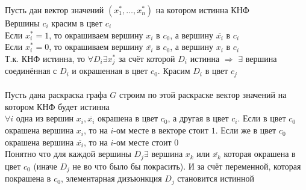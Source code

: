 \documentclass[12pt]{article}
\begin{document}
		Пусть дан вектор значений $(x_1^*, \dotsc, x_n^*)$ на котором истинна КНФ\\
		Вершины $c_i$ красим в цвет $c_i$\\
		Если $x_i^* = 1$, то окрашиваем вершину $x_i$ в $c_0$, а вершину $\overline{x_i}$ в $c_i$\\
		Если $x_i^* = 0$, то окрашиваем вершину $\overline{x_i}$ в $c_0$, а вершину $x_i$ в $c_i$\\
		Т.к. КНФ истинна, то $\forall D_i \exists x_j^*$ за счёт которой $D_i$ истинна $\Rightarrow$ $\exists$ вершина соединённая с $D_i$  и окрашенная в цвет $c_0$. Красим $D_i$ в цвет $c_j$\\\\
		Пусть дана раскраска графа $G$ строим по этой раскраске вектор значений на котором КНФ будет истинна\\
		$\forall i$ одна из вершин $x_i, \overline{x_i}$ окрашена в цвет $c_0$, а другая в цвет $c_i$. Если в цвет $c_0$ окрашена вершина $x_i$, то на $i$-ом месте в векторе стоит $1$. Если же в цвет $c_0$ окрашена вершина $\overline{x_i}$, то на $i$-ом месте стоит $0$\\
		Понятно что для каждой вершины $D_j \exists$ вершина $x_k$ или $\overline{x_k}$ которая окрашена в цвет $c_0$ (иначе $D_j$ не во что было бы покрасить). И за счёт переменной, которая покрашена в $c_0$, элементарная дизъюнкция $D_j$ становится истинной\\
	\qedsymbol
\end{document}

